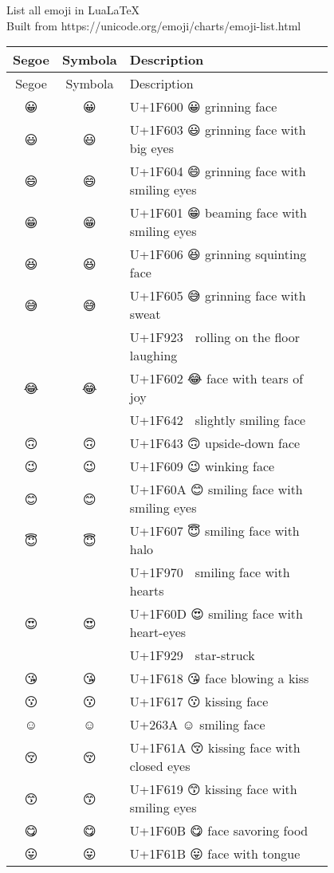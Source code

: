 \documentclass[a4paper,12pt]{article}
\newcommand{\fontA}[1]{{\fontspec[RawFeature={dist,ccmp}]{Segoe UI Emoji} #1}}
\newcommand{\fontB}[1]{{\fontspec[Ligatures=Common,RawFeature={+ccmp}]{Symbola_Hinted.ttf} #1}}
\begin{document}
\noindent
List all emoji in LuaLaTeX\\
Built from https://unicode.org/emoji/charts/emoji-list.html

\noindent
\begin{longtable}[c]{ccp{0.8\linewidth}}
Segoe&Symbola&Description\\\hline
\endfirsthead  
Segoe&Symbola&Description\\\hline
\endhead  
\fontA{😀}&\fontB{😀}&U+1F600 😀 grinning face\\
\fontA{😃}&\fontB{😃}&U+1F603 😃 grinning face with big eyes\\
\fontA{😄}&\fontB{😄}&U+1F604 😄 grinning face with smiling eyes\\
\fontA{😁}&\fontB{😁}&U+1F601 😁 beaming face with smiling eyes\\
\fontA{😆}&\fontB{😆}&U+1F606 😆 grinning squinting face\\
\fontA{😅}&\fontB{😅}&U+1F605 😅 grinning face with sweat\\
\fontA{🤣}&\fontB{🤣}&U+1F923 🤣 rolling on the floor laughing\\
\fontA{😂}&\fontB{😂}&U+1F602 😂 face with tears of joy\\
\fontA{🙂}&\fontB{🙂}&U+1F642 🙂 slightly smiling face\\
\fontA{🙃}&\fontB{🙃}&U+1F643 🙃 upside-down face\\
\fontA{😉}&\fontB{😉}&U+1F609 😉 winking face\\
\fontA{😊}&\fontB{😊}&U+1F60A 😊 smiling face with smiling eyes\\
\fontA{😇}&\fontB{😇}&U+1F607 😇 smiling face with halo\\
\fontA{🥰}&\fontB{🥰}&U+1F970 🥰 smiling face with hearts\\
\fontA{😍}&\fontB{😍}&U+1F60D 😍 smiling face with heart-eyes\\
\fontA{🤩}&\fontB{🤩}&U+1F929 🤩 star-struck\\
\fontA{😘}&\fontB{😘}&U+1F618 😘 face blowing a kiss\\
\fontA{😗}&\fontB{😗}&U+1F617 😗 kissing face\\
\fontA{☺}&\fontB{☺}&U+263A ☺ smiling face\\
\fontA{😚}&\fontB{😚}&U+1F61A 😚 kissing face with closed eyes\\
\fontA{😙}&\fontB{😙}&U+1F619 😙 kissing face with smiling eyes\\
\fontA{😋}&\fontB{😋}&U+1F60B 😋 face savoring food\\
\fontA{😛}&\fontB{😛}&U+1F61B 😛 face with tongue\\

\end{longtable}
\end{document}
